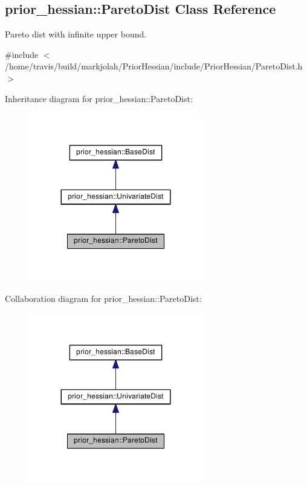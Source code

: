 \hypertarget{classprior__hessian_1_1ParetoDist}{}\subsection{prior\+\_\+hessian\+:\+:Pareto\+Dist Class Reference}
\label{classprior__hessian_1_1ParetoDist}


Pareto dist with infinite upper bound.  




{\ttfamily \#include $<$/home/travis/build/markjolah/\+Prior\+Hessian/include/\+Prior\+Hessian/\+Pareto\+Dist.\+h$>$}



Inheritance diagram for prior\+\_\+hessian\+:\+:Pareto\+Dist\+:\nopagebreak
\begin{figure}[H]
\begin{center}
\leavevmode
\includegraphics[width=215pt]{classprior__hessian_1_1ParetoDist__inherit__graph}
\end{center}
\end{figure}


Collaboration diagram for prior\+\_\+hessian\+:\+:Pareto\+Dist\+:\nopagebreak
\begin{figure}[H]
\begin{center}
\leavevmode
\includegraphics[width=215pt]{classprior__hessian_1_1ParetoDist__coll__graph}
\end{center}
\end{figure}
